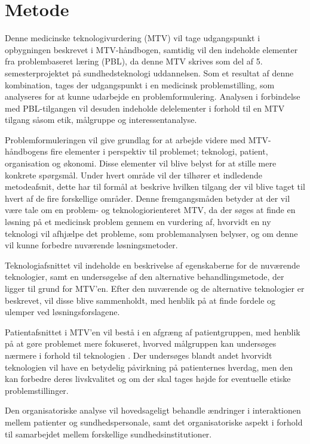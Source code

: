 \chapter{Metode} \label{metode}

Denne medicinske teknologivurdering (MTV) vil tage udgangspunkt i opbygningen beskrevet i MTV-håndbogen, samtidig vil den indeholde elementer fra problembaseret læring (PBL), da denne MTV skrives som del af 5. semesterprojektet på sundhedsteknologi uddannelsen. Som et resultat af denne kombination, tages der udgangspunkt i en medicinsk problemstilling, som analyseres for at kunne udarbejde en problemformulering. Analysen i forbindelse med PBL-tilgangen vil desuden indeholde delelementer i forhold til en MTV tilgang såsom etik, målgruppe og interessentanalyse.

Problemformuleringen vil give grundlag for at arbejde videre med MTV-håndbogens fire elementer i perspektiv til problemet; teknologi, patient, organisation og økonomi. Disse elementer vil blive belyst for at stille mere konkrete spørgsmål. Under hvert område vil der tilhører et indledende metodeafsnit, dette har til formål at beskrive hvilken tilgang der vil blive taget til hvert af de fire forskellige områder. Denne fremgangsmåden betyder at der vil være tale om en problem- og teknologiorienteret MTV, da der søges at finde en løsning på et medicinsk problem gennem en vurdering af, hvorvidt en ny teknologi vil afhjælpe det probleme, som problemanalysen belyser, og om denne vil kunne forbedre nuværende løsningsmetoder. 

Teknologiafsnittet vil indeholde en beskrivelse af egenskaberne for de nuværende teknologier, samt en undersøgelse af den alternative behandlingsmetode, der ligger til grund for MTV'en. Efter den nuværende og de alternative teknologier er beskrevet, vil disse blive sammenholdt, med henblik på at finde fordele og ulemper ved løsningsforslagene.

Patientafsnittet i MTV’en vil bestå i en afgræng af  patientgruppen, med henblik på at gøre problemet mere fokuseret, hvorved målgruppen kan undersøges nærmere  i forhold til teknologien . Der undersøges blandt andet hvorvidt teknologien vil have en betydelig påvirkning på patienternes hverdag, men den kan forbedre deres livskvalitet og om der skal tages højde for eventuelle etiske problemstillinger.

Den organisatoriske analyse vil hovedsageligt behandle ændringer i interaktionen mellem  patienter og sundhedspersonale, samt det organisatoriske aspekt i forhold til samarbejdet mellem forskellige sundhedsinstitutioner.

